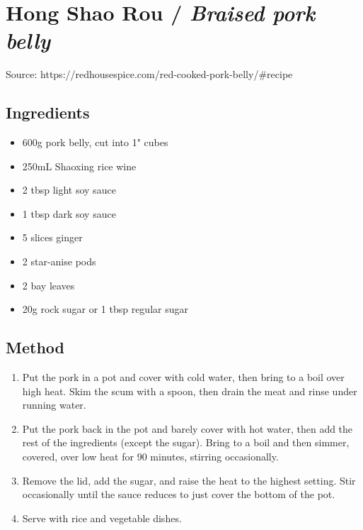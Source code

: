 \section{Hong Shao Rou / \emph{Braised pork belly}}


Source: https://redhousespice.com/red-cooked-pork-belly/\#recipe

\subsection{Ingredients}

\begin{itemize}
    \item 600g pork belly, cut into 1" cubes
    \item 250mL Shaoxing rice wine
    \item 2 tbsp light soy sauce
    \item 1 tbsp dark soy sauce
    \item 5 slices ginger
    \item 2 star-anise pods
    \item 2 bay leaves
    \item 20g rock sugar or 1 tbsp regular sugar
\end{itemize}

\subsection{Method}

\begin{enumerate}
    \item Put the pork in a pot and cover with cold water, then bring to a boil over high heat. Skim the scum with a spoon, then drain the meat and rinse under running water.
    \item Put the pork back in the pot and barely cover with hot water, then add the rest of the ingredients (except the sugar). Bring to a boil and then simmer, covered, over low heat for 90 minutes, stirring occasionally.
    \item Remove the lid, add the sugar, and raise the heat to the highest setting. Stir occasionally until the sauce reduces to just cover the bottom of the pot.
    \item Serve with rice and vegetable dishes.
\end{enumerate}
